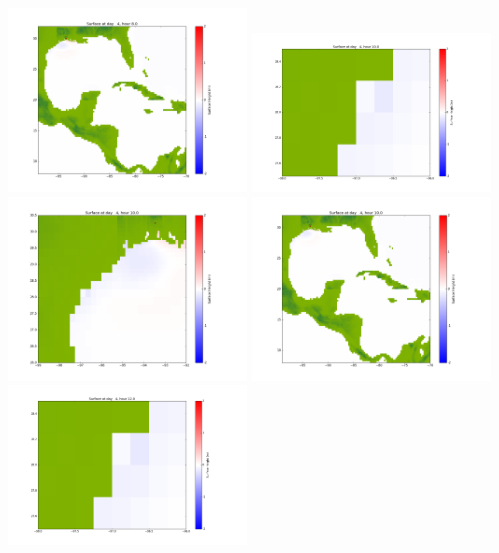 \documentclass[11pt]{article}
\begin{document}
\vskip 10pt 
\includegraphics[width=0.475\textwidth]{frame0076fig1003.png}
\vskip 10pt 
\includegraphics[width=0.475\textwidth]{frame0077fig1001.png}
\includegraphics[width=0.475\textwidth]{frame0077fig1002.png}
\vskip 10pt 
\includegraphics[width=0.475\textwidth]{frame0077fig1003.png}
\vskip 10pt 
\includegraphics[width=0.475\textwidth]{frame0078fig1001.png}
\end{document}
